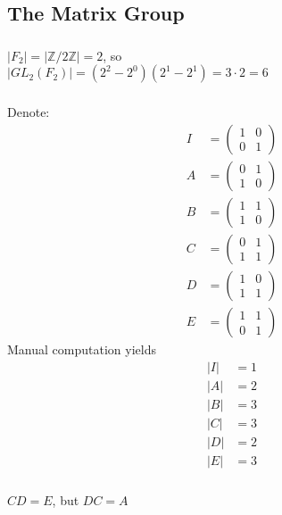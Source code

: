 \documentclass{article}
\newcommand{\ints}{\mathbb{Z}}
\begin{document}
\subsection{The Matrix Group}\label{sec4}  
\subsubsection{}\label{ex4p1}
$|F_2| = |\ints/2\ints| = 2$, so\\
$|GL_2(F_2)| = (2^2 - 2^0)(2^1 - 2^1) = 3\cdot 2 = 6$
\subsubsection{}\label{ex4p2}
Denote:
\begin{align*}
I &= 
\begin{pmatrix}
1 & 0\\
0 & 1
\end{pmatrix}\\
A &= 
\begin{pmatrix}
0 & 1\\
1 & 0
\end{pmatrix}\\
B &= 
\begin{pmatrix}
1 & 1\\
1 & 0
\end{pmatrix}\\
C &= 
\begin{pmatrix}
0 & 1\\
1 & 1
\end{pmatrix}\\
D &= 
\begin{pmatrix}
1 & 0\\
1 & 1
\end{pmatrix}\\
E &= 
\begin{pmatrix}
1 & 1\\
0 & 1
\end{pmatrix}
\end{align*}
Manual computation yields
\begin{align*}
|I| &= 1\\
|A| &= 2\\
|B| &= 3\\
|C| &= 3\\
|D| &= 2\\
|E| &= 3
\end{align*}
\subsubsection{}\label{ex4p3}
$CD = E$, but $DC = A$
\end{document}
